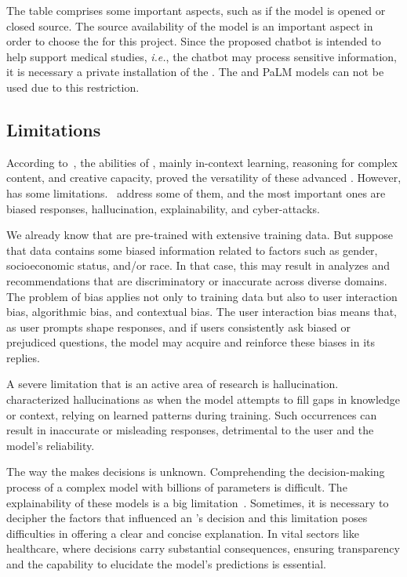 The table comprises some important aspects, such as if the model is opened or closed source. The source availability of the model is an important aspect in order to choose the {\llm} for this project. Since the proposed chatbot is intended to help support medical studies, \textit{i.e.}, the chatbot may process sensitive information, it is necessary a private installation of the {\llm}. The {\gpt} and PaLM models can not be used due to this restriction.



\subsection{Limitations}

According to~\citet{liu_prompting_nodate}, the abilities of {\llm}, mainly in-context learning, reasoning for complex content, and creative capacity, proved the versatility of these advanced {\lm}. However, {\llm} has some limitations.~\citet{hadi_LLM_2023} address some of them, and the most important ones are biased responses, hallucination, explainability, and cyber-attacks. 

We already know that {\llm} are pre-trained with extensive training data. But suppose that data contains some biased information related to factors such as gender, socioeconomic status, and/or race. In that case, this may result in analyzes and recommendations that are discriminatory or inaccurate across diverse domains. The problem of bias applies not only to training data but also to user interaction bias, algorithmic bias, and contextual bias. The user interaction bias means that, as user prompts shape responses, and if users consistently ask biased or prejudiced questions, the model may acquire and reinforce these biases in its replies.

A severe limitation that is an active area of research is hallucination.~\citet{church_emerging_2023} characterized {\llm} hallucinations as when the model attempts to fill gaps in knowledge or context, relying on learned patterns during training. Such occurrences can result in inaccurate or misleading responses, detrimental to the user and the model's reliability.

The way the {\llm} makes decisions is unknown. Comprehending the decision-making process of a complex model with billions of parameters is difficult. The explainability of these models is a big limitation~\cite{hadi_LLM_2023}. Sometimes, it is necessary to decipher the factors that influenced an {\llm}'s decision and this limitation poses difficulties in offering a clear and concise explanation. In vital sectors like healthcare, where decisions carry substantial consequences, ensuring transparency and the capability to elucidate the model's predictions is essential.


